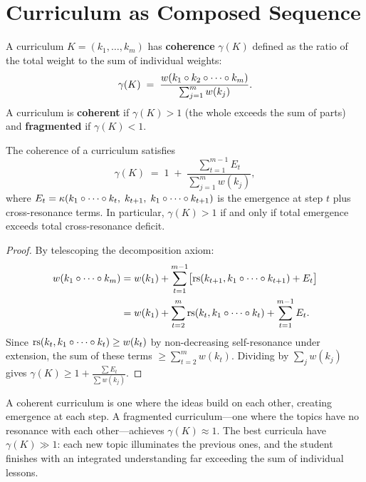 \section{Curriculum as Composed Sequence}
\label{sec:curriculum}

\begin{definition}
\label{def:coherence}
A curriculum $K = (k_1, \ldots, k_m)$ has \textbf{coherence} $\gamma(K)$
defined as the ratio of the total weight to the sum of individual weights:
\[
  \gamma(K) \;=\;
  \frac{w(k_1 \circ k_2 \circ \cdots \circ k_m)}{
    \sum_{j=1}^m w(k_j)}.
\]
A curriculum is \textbf{coherent} if $\gamma(K) > 1$ (the whole
exceeds the sum of parts) and \textbf{fragmented} if $\gamma(K) < 1$.
\end{definition}

\begin{theorem}
\label{thm:coherence-emergence}
The coherence of a curriculum satisfies
\[
  \gamma(K) \;=\; 1 \;+\;
  \frac{\sum_{t=1}^{m-1} E_t}{\sum_{j=1}^m w(k_j)},
\]
where $E_t = \kappa(k_1 \circ \cdots \circ k_t,\; k_{t+1},\;
k_1 \circ \cdots \circ k_{t+1})$ is the emergence at
step $t$ plus cross-resonance terms.  In particular,
$\gamma(K) > 1$ if and only if total emergence exceeds total
cross-resonance deficit.
\end{theorem}

\begin{proof}
By telescoping the decomposition axiom:
\begin{align*}
  w(k_1 \circ \cdots \circ k_m)
  &= w(k_1) + \sum_{t=1}^{m-1} \bigl[
     \mathrm{rs}(k_{t+1}, k_1 \circ \cdots \circ k_{t+1})
     + E_t \bigr] \\
  &= w(k_1) + \sum_{t=2}^{m} \mathrm{rs}(k_t, k_1 \circ \cdots \circ k_t)
     + \sum_{t=1}^{m-1} E_t.
\end{align*}
Since $\mathrm{rs}(k_t, k_1 \circ \cdots \circ k_t) \ge w(k_t)$ by
non-decreasing self-resonance under extension, the sum of these
terms $\ge \sum_{t=2}^m w(k_t)$.  Dividing by $\sum_j w(k_j)$
gives $\gamma(K) \ge 1 + \frac{\sum E_t}{\sum w(k_j)}$.
\end{proof}

\begin{interpretation}
A coherent curriculum is one where the ideas build on each other,
creating emergence at each step.  A fragmented curriculum---one
where the topics have no resonance with each other---achieves
$\gamma(K) \approx 1$.  The best curricula have $\gamma(K) \gg 1$:
each new topic illuminates the previous ones, and the student
finishes with an integrated understanding far exceeding the sum
of individual lessons.
\end{interpretation}

